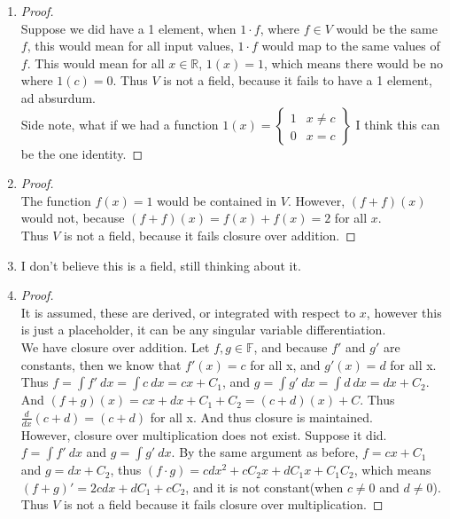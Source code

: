 \documentclass[12pt]{article}   %
\newcommand{\R}{\mathbb{R}} %
\newcommand{\F}{\mathbb{F}} %
\begin{document}
\begin{enumerate}[label=(\alph*)]
    \item
    \begin{proof}\ \\
    Suppose we did have a 1 element, when $1\cdot f$, where $f\in V$ would be the same $f$, this would mean for all input values, $1\cdot f$ would map to the same values of $f$. This would mean for all $x\in \R$, $1(x)=1$, which means there would be no where $1(c)=0$. Thus $V$ is not a field, because it fails to have a 1 element, ad absurdum.\\
    Side note, what if we had a function $1(x)=\left \{\begin{array}{c|c}
         1& x\neq c  \\
         0 & x=c
    \end{array}\right \}$
    I think this can be the one identity.
    \end{proof}
    \item
    \begin{proof}\ \\
    The function $f(x)=1$ would be contained in $V$. However, $(f+f)(x)$ would not, because $(f+f)(x)=f(x)+f(x)=2$ for all $x$.\\
    Thus $V$ is not a field, because it fails closure over addition.
    \end{proof}
    \item
    I don't believe this is a field, still thinking about it.
    \item
    \begin{proof}\ \\
    It is assumed, these are derived, or integrated with respect to $x$, however this is just a placeholder, it can be any singular variable differentiation.\\
    We have closure over addition. Let $f,g\in \F$, and because $f'$ and $g'$ are constants, then we know that $f'(x)=c$ for all x, and $g'(x)=d$ for all x. Thus $f=\int f'\ dx=\int c\ dx= cx+C_1$, and $g=\int g'\ dx=\int d\ dx= dx+C_2$. And $(f+g)(x)=cx+dx+C_1+C_2=(c+d)(x)+C$. Thus $\frac{d}{dx}(c+d)=(c+d)$ for all x. And thus closure is maintained.\\
    However, closure over multiplication does not exist. Suppose it did. $f=\int f'\ dx$ and $g=\int g'\ dx$. By the same argument as before, $f=cx+C_1$ and $g=dx+C_2$, thus $(f\cdot g)=cdx^2+cC_2x+dC_1x+C_1C_2$, which means $(f+g)'=2cdx+dC_1+cC_2$, and it is not constant(when $c\neq 0$ and $d\neq 0$). Thus $V$ is not a field because it fails closure over multiplication.
    \end{proof}
\end{enumerate}
\end{document}
